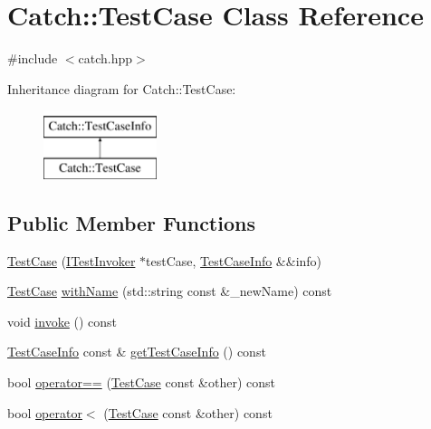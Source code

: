 \hypertarget{class_catch_1_1_test_case}{}\section{Catch\+::Test\+Case Class Reference}
\label{class_catch_1_1_test_case}


{\ttfamily \#include $<$catch.\+hpp$>$}

Inheritance diagram for Catch\+::Test\+Case\+:\begin{figure}[H]
\begin{center}
\leavevmode
\includegraphics[height=2.000000cm]{class_catch_1_1_test_case}
\end{center}
\end{figure}
\subsection*{Public Member Functions}
\begin{DoxyCompactItemize}
\item 
\mbox{\hyperlink{class_catch_1_1_test_case_aae5709fc1cb68e19ab0ac27e1ffd6a76}{Test\+Case}} (\mbox{\hyperlink{struct_catch_1_1_i_test_invoker}{I\+Test\+Invoker}} $\ast$test\+Case, \mbox{\hyperlink{struct_catch_1_1_test_case_info}{Test\+Case\+Info}} \&\&info)
\item 
\mbox{\hyperlink{class_catch_1_1_test_case}{Test\+Case}} \mbox{\hyperlink{class_catch_1_1_test_case_a0812e8a216d09b087d5874687009f0d6}{with\+Name}} (std\+::string const \&\+\_\+new\+Name) const
\item 
void \mbox{\hyperlink{class_catch_1_1_test_case_a26f346c8446dded0562fe3818ae71651}{invoke}} () const
\item 
\mbox{\hyperlink{struct_catch_1_1_test_case_info}{Test\+Case\+Info}} const  \& \mbox{\hyperlink{class_catch_1_1_test_case_a1ea0d79f49156cebea076fe1ba50d2b6}{get\+Test\+Case\+Info}} () const
\item 
bool \mbox{\hyperlink{class_catch_1_1_test_case_a5456d03a90f75292835c158f3a3374a1}{operator==}} (\mbox{\hyperlink{class_catch_1_1_test_case}{Test\+Case}} const \&other) const
\item 
bool \mbox{\hyperlink{class_catch_1_1_test_case_a030e4b9282e9b32e08c8bd5e5cd6fa98}{operator$<$}} (\mbox{\hyperlink{class_catch_1_1_test_case}{Test\+Case}} const \&other) const
\end{DoxyCompactItemize}
